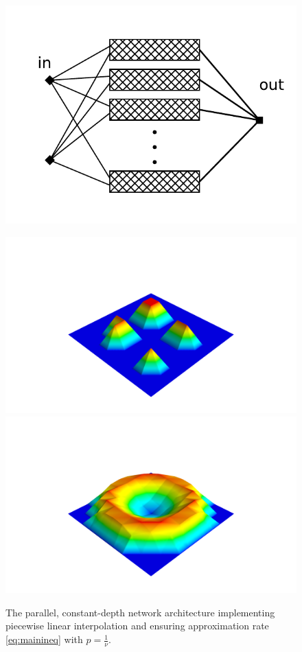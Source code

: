 \documentclass[final, 12pt]{colt2018}
\begin{document}
\begin{figure}[t]
\begin{center}
\includegraphics[clip,trim=5mm 10mm 0mm 10mm, scale=0.8]{shallowNet.pdf}
\caption{The parallel, constant-depth network architecture implementing piecewise linear interpolation and ensuring approximation rate \eqref{eq:mainineq} with $p=\frac{1}{\nu}$.}\label{fig:shallow}
\includegraphics[clip,trim=120mm 30mm 120mm 105mm, scale=0.15]{spikes_lin4.png}
\includegraphics[clip,trim=120mm 30mm 120mm 125mm, scale=0.15]{spikes_lin5.png}

\end{center}
\end{figure}
\end{document}
